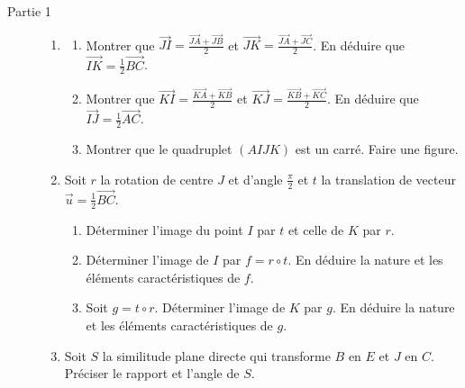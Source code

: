       \begin{description}
            \item[Partie 1]
                  \begin{enumerate}
                        \item \begin{enumerate}
                                    \item Montrer que $\overrightarrow{JI} = \frac{\overrightarrow{JA} + \overrightarrow{JB}}{2}$
                                          et $\overrightarrow{JK} = \frac{\overrightarrow{JA} + \overrightarrow{JC}}{2}$.
                                          En d\'eduire que $\overrightarrow{IK} = \frac{1}{2} \overrightarrow{BC}$.
                                    \item Montrer que $\overrightarrow{KI} = \frac{\overrightarrow{KA} + \overrightarrow{KB}}{2}$
                                          et $\overrightarrow{KJ} = \frac{\overrightarrow{KB}+\overrightarrow{KC}}{2}$.
                                          En d\'eduire que $\overrightarrow{IJ} = \frac{1}{2} \overrightarrow{AC}$.
                                    \item Montrer que le quadruplet $(AIJK)$ est un carr\'e. Faire une figure.
                              \end{enumerate}
                        \item Soit $r$ la rotation de centre $J$ et d'angle $\frac{\pi}{2}$ et $t$ la translation de 
                              vecteur $\vec{u} = \frac{1}{2} \overrightarrow{BC}$.
                              \begin{enumerate}
                                    \item D\'eterminer l'image du point $I$ par $t$ et celle de $K$ par $r$.
                                    \item D\'eterminer l'image de $I$ par $f = r \circ t$. 
                                          En d\'eduire la nature et les \'el\'ements caract\'eristiques de $f$.
                                    \item Soit $g = t \circ r$.
                                          D\'eterminer l'image de $K$ par $g$.
                                          En d\'eduire la nature et les \'el\'ements caract\'eristiques de $g$.
                              \end{enumerate}
                        \item Soit $S$ la similitude plane directe qui transforme $B$ en $E$ et $J$ en $C$.
                              Pr\'eciser le rapport et l'angle de $S$.
                              \label{quest: Bac C 2005 Pbm 1 Part 1 quest 3}
                              

\end{enumerate}
\end{description}
